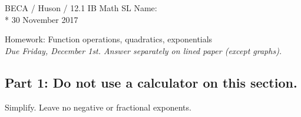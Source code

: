 \documentclass[]{book}
\begin{document}
\noindent BECA / Huson / 12.1 IB Math SL \hspace{2in} Name:\\*
30 November 2017
\begin{center}
{\Large Homework: Function operations, quadratics, exponentials}\\
\textit{Due Friday, December 1st. Answer separately on lined paper (except graphs).}
\end{center}

\subsection*{Part 1: Do not use a calculator on this section.}


Simplify. Leave no negative or fractional exponents.
\end{document}
